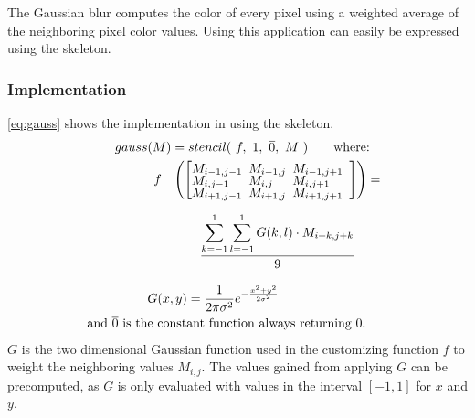 The Gaussian blur computes the color of every pixel using a weighted average of the neighboring pixel color values.
Using \SkelCL this application can easily be expressed using the \stencil skeleton.

\subsubsection*{\SkelCL Implementation}
\autoref{eq:gauss} shows the implementation in \SkelCL using the \stencil skeleton.
\begin{align}
  \label{eq:gauss}
  gauss&(M) = stencil(\ f,\ 1,\ \overline{0},\ M\ ) \qquad\text{where:}\\
  &
  \begin{array}{ll}%
  f &\left(\left[\begin{array}{lll}%
      \hspace{-.5em} M_{i-1,j-1}& \hspace{-.5em} M_{i-1,j} & \hspace{-.5em}M_{i-1,j+1}\vspace{-.25em}\\%
      \hspace{-.5em} M_{i,j-1}& \hspace{-.5em} M_{i,j} & \hspace{-.5em}M_{i,j+1}\vspace{-.25em}\\%
      \hspace{-.5em} M_{i+1,j-1}& \hspace{-.5em} M_{i+1,j} & \hspace{-.5em}M_{i+1,j+1}\vspace{-.25em}
    \end{array}\right] \right) = \\[2em]
          &\qquad \displaystyle\frac{\displaystyle\sum_{k=-1}^{1} \sum_{l=-1}^{1} G(k, l)\cdot M_{i+k, j+k}}{9}
  \end{array} \nonumber\\[1em]
  &G(x, y) = \frac{1}{2\pi \sigma^{2}} e^{-\frac{x^2 + y^2}{2\sigma^2}} \nonumber\\
  \text{and } \overline{0} \text{ is th}&\text{e constant function always returning 0.}\nonumber
\end{align}
$G$ is the two dimensional Gaussian function used in the customizing function $f$ to weight the neighboring values $M_{i,j}$.
The values gained from applying $G$ can be precomputed, as $G$ is only evaluated with values in the interval $[-1, 1]$ for $x$ and $y$.


